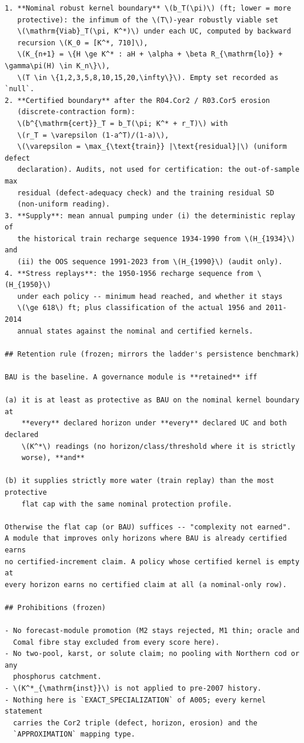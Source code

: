 \begin{footnotesize}
\begin{verbatim}
1. **Nominal robust kernel boundary** \(b_T(\pi)\) (ft; lower = more
   protective): the infimum of the \(T\)-year robustly viable set
   \(\mathrm{Viab}_T(\pi, K^*)\) under each UC, computed by backward
   recursion \(K_0 = [K^*, 710]\),
   \(K_{n+1} = \{H \ge K^* : aH + \alpha + \beta R_{\mathrm{lo}} + \gamma\pi(H) \in K_n\}\),
   \(T \in \{1,2,3,5,8,10,15,20,\infty\}\). Empty set recorded as `null`.
2. **Certified boundary** after the R04.Cor2 / R03.Cor5 erosion
   (discrete-contraction form):
   \(b^{\mathrm{cert}}_T = b_T(\pi; K^* + r_T)\) with
   \(r_T = \varepsilon (1-a^T)/(1-a)\),
   \(\varepsilon = \max_{\text{train}} |\text{residual}|\) (uniform defect
   declaration). Audits, not used for certification: the out-of-sample max
   residual (defect-adequacy check) and the training residual SD
   (non-uniform reading).
3. **Supply**: mean annual pumping under (i) the deterministic replay of
   the historical train recharge sequence 1934-1990 from \(H_{1934}\) and
   (ii) the OOS sequence 1991-2023 from \(H_{1990}\) (audit only).
4. **Stress replays**: the 1950-1956 recharge sequence from \(H_{1950}\)
   under each policy -- minimum head reached, and whether it stays
   \(\ge 618\) ft; plus classification of the actual 1956 and 2011-2014
   annual states against the nominal and certified kernels.

## Retention rule (frozen; mirrors the ladder's persistence benchmark)

BAU is the baseline. A governance module is **retained** iff

(a) it is at least as protective as BAU on the nominal kernel boundary at
    **every** declared horizon under **every** declared UC and both declared
    \(K^*\) readings (no horizon/class/threshold where it is strictly
    worse), **and**

(b) it supplies strictly more water (train replay) than the most protective
    flat cap with the same nominal protection profile.

Otherwise the flat cap (or BAU) suffices -- "complexity not earned".
A module that improves only horizons where BAU is already certified earns
no certified-increment claim. A policy whose certified kernel is empty at
every horizon earns no certified claim at all (a nominal-only row).

## Prohibitions (frozen)

- No forecast-module promotion (M2 stays rejected, M1 thin; oracle and
  Comal fibre stay excluded from every score here).
- No two-pool, karst, or solute claim; no pooling with Northern cod or any
  phosphorus catchment.
- \(K^*_{\mathrm{inst}}\) is not applied to pre-2007 history.
- Nothing here is `EXACT_SPECIALIZATION` of A005; every kernel statement
  carries the Cor2 triple (defect, horizon, erosion) and the
  `APPROXIMATION` mapping type.

\end{verbatim}\end{footnotesize}
